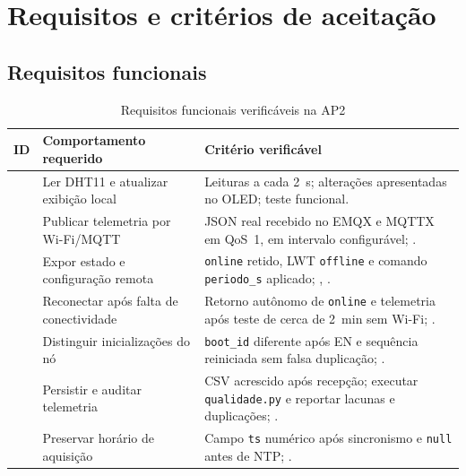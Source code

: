 \chapter{Requisitos e critérios de aceitação}
\label{cap:requisitos}
\rubricaRobustez
\section{Requisitos funcionais}
\begin{table}[H]\centering\caption{Requisitos funcionais verificáveis na AP2}\label{tab:rf}\scriptsize
\begin{tabular}{@{}L{1.2cm}L{6.1cm}L{7.1cm}@{}}\toprule
\textbf{ID}&\textbf{Comportamento requerido}&\textbf{Critério verificável}\\\midrule
{}&Ler DHT11 e atualizar exibição local&Leituras a cada 2~s; alterações apresentadas no OLED; teste funcional.\\
&Publicar telemetria por Wi-Fi/MQTT&JSON real recebido no EMQX e MQTTX em QoS~1, em intervalo configurável; .\\
&Expor estado e configuração remota&\texttt{online} retido, LWT \texttt{offline} e comando \texttt{periodo\_s} aplicado; , .\\
&Reconectar após falta de conectividade&Retorno autônomo de \texttt{online} e telemetria após teste de cerca de 2~min sem Wi-Fi; .\\
&Distinguir inicializações do nó&\texttt{boot\_id} diferente após EN e sequência reiniciada sem falsa duplicação; .\\
&Persistir e auditar telemetria&CSV acrescido após recepção; executar \texttt{qualidade.py} e reportar lacunas e duplicações; .\\
&Preservar horário de aquisição&Campo \texttt{ts} numérico após sincronismo e \texttt{null} antes de NTP; .\\
\bottomrule\end{tabular}\end{table}
